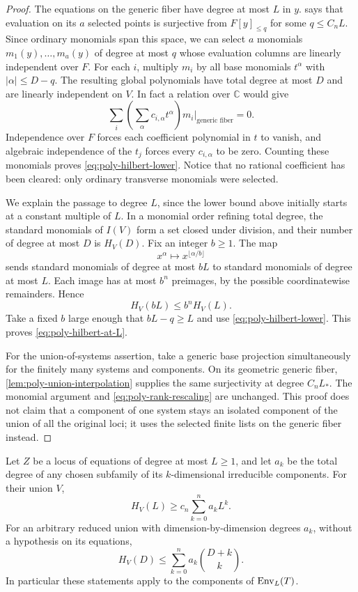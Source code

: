\begin{proof}
The equations on the generic fiber have degree at most $L$ in $y$.  says that evaluation on its $a$ selected points is surjective from $F[y]_{\le q}$ for some $q\le C_nL$. Since ordinary monomials span this space, we can select $a$ monomials $m_1(y),\ldots,m_a(y)$ of degree at most $q$ whose evaluation columns are linearly independent over $F$.  For each $i$, multiply $m_i$ by all base monomials $t^\alpha$ with $|\alpha|\le D-q$.  The resulting global polynomials have total degree at most $D$ and are linearly independent on $V$.  In fact a relation over $\mathbb{C}$ would give
\[
 \sum_i\left(\sum_\alpha c_{i,\alpha}t^\alpha\right)
                m_i\big|_{\text{generic fiber}}=0.
\]
Independence over $F$ forces each coefficient polynomial in $t$ to vanish, and algebraic independence of the $t_j$ forces every $c_{i,\alpha}$ to be zero.  Counting these monomials proves \eqref{eq:poly-hilbert-lower}.  Notice that no rational coefficient has been cleared: only ordinary transverse monomials were selected.

We explain the passage to degree $L$, since the lower bound above initially starts at a constant multiple of $L$.  In a monomial order refining total degree, the standard monomials of $I(V)$ form a set closed under division, and their number of degree at most $D$ is $H_V(D)$.  Fix an integer $b\ge1$.  The map
\[
 x^\alpha\longmapsto x^{\lfloor\alpha/b\rfloor}
\]
sends standard monomials of degree at most $bL$ to standard monomials of degree at most $L$.  Each image has at most $b^n$ preimages, by the possible coordinatewise remainders.  Hence
\begin{equation}\label{eq:poly-rank-rescaling}
 H_V(bL)\le b^n H_V(L).
\end{equation}
Take a fixed $b$ large enough that $bL-q\ge L$ and use \eqref{eq:poly-hilbert-lower}.  This proves \eqref{eq:poly-hilbert-at-L}.

For the union-of-systems assertion, take a generic base projection simultaneously for the finitely many systems and components.  On its geometric generic fiber, \cref{lem:poly-union-interpolation} supplies the same surjectivity at degree $C_nL_*$.  The monomial argument and \eqref{eq:poly-rank-rescaling} are unchanged.  This proof does not claim that a component of one system stays an isolated component of the union of all the original loci; it uses the selected finite lists on the generic fiber instead.
\end{proof}

\begin{corollary}\label{cor:poly-envelope}
Let $Z$ be a locus of equations of degree at most $L\ge1$, and let $a_k$ be the total degree of any chosen subfamily of its $k$-dimensional irreducible components.  For their union $V$,
\[
 H_V(L)\ge c_n\sum_{k=0}^n a_kL^k.
\]
For an arbitrary reduced union with dimension-by-dimension degrees $a_k$, without a hypothesis on its equations,
\[
 H_V(D)\le\sum_{k=0}^n a_k\binom{D+k}{k}.
\]
In particular these statements apply to the components of $\operatorname{Env}_L(T)$.
\end{corollary}

